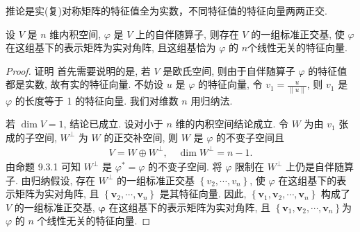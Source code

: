 \begin{note}
    推论是实(复)对称矩阵的特征值全为实数，不同特征值的特征向量两两正交.
\end{note}

\begin{theorem}[实对称正交相似对角化的几何证明]\label{memeda12}
    设 $V$ 是 $n$ 维内积空间, $\varphi$ 是 $V$ 上的自伴随算子, 则存在 $V$ 的一组标准正交基, 使 $\varphi$ 在这组基下的表示矩阵为实对角阵, 且这组基恰为 $\varphi$ 的 $n$个线性无关的特征向量.
\end{theorem}

\begin{proof}
    证明 首先需要说明的是, 若 $V$ 是欧氏空间, 则由于自伴随算子 $\varphi$ 的特征值都是实数, 故有实的特征向量. 不妨设 $u$ 是 $\varphi$ 的特征向量, 令 $v_1=\frac{u}{\|u\|}$, 则 $v_1$ 是 $\varphi$ 的长度等于 1 的特征向量. 我们对维数 $n$ 用归纳法.

    若 $\operatorname{dim} V=1$, 结论已成立. 设对小于 $n$ 维的内积空间结论成立. 令 $W$ 为由 $v_1$ 张成的子空间, $W^{\perp}$ 为 $W$ 的正交补空间, 则 $W$ 是 $\varphi$ 的不变子空间且
    \begin{align*}
        V=W \oplus W^{\perp}, \quad \operatorname{dim} W^{\perp}=n-1 .
    \end{align*}
    由命题 9.3.1 可知 $W^{\perp}$ 是 $\varphi^*=\varphi$ 的不变子空间. 将 $\varphi$ 限制在 $W^{\perp}$ 上仍是自伴随算子. 由归纳假设, 存在 $W^{\perp}$ 的一组标准正交基 $\left\{v_2, \cdots, v_n\right\}$, 使 $\varphi$ 在这组基下的表示矩阵为实对角阵, 且 $\left\{\boldsymbol{v}_2, \cdots, \boldsymbol{v}_n\right\}$ 是其特征向量. 因此, $\left\{\boldsymbol{v}_1, \boldsymbol{v}_2, \cdots, \boldsymbol{v}_n\right\}$ 构成了 $V$ 的一组标准正交基, $\boldsymbol{\varphi}$ 在这组基下的表示矩阵为实对角阵, 且 $\left\{\boldsymbol{v}_1, \boldsymbol{v}_2, \cdots, \boldsymbol{v}_n\right\}$为 $\varphi$ 的 $n$ 个线性无关的特征向量.
\end{proof}

